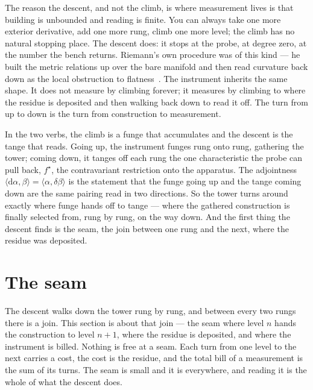 The reason the descent, and not the climb, is where measurement lives is that building is unbounded and reading is finite. You
can always take one more exterior derivative, add one more rung, climb one more level; the climb has no natural stopping
place. The descent does: it stops at the probe, at degree zero, at the number the bench returns. Riemann's own procedure was of
this kind --- he built the metric relations up over the bare manifold and then read curvature back down as the local
obstruction to flatness~\cite{riemann1854}. The instrument inherits the same shape. It does not measure by climbing forever;
it measures by climbing to where the residue is deposited and then walking back down to read it off. The turn from up to
down is the turn from construction to measurement.

In the two verbs, the climb is a funge that accumulates and the descent is the tange that reads. Going up, the instrument
funges rung onto rung, gathering the tower; coming down, it tanges off each rung the one characteristic the probe can pull
back, $f^\star$, the contravariant restriction onto the apparatus. The adjointness $\langle \mathrm{d}\alpha, \beta\rangle =
\langle \alpha, \delta\beta\rangle$ is the statement that the funge going up and the tange coming down are the same pairing
read in two directions. So the tower turns around exactly where funge hands off to tange --- where the gathered construction
is finally selected from, rung by rung, on the way down. And the first thing the descent finds is the seam, the join between
one rung and the next, where the residue was deposited.

\section{The seam}

The descent walks down the tower rung by rung, and between every two rungs there is a join. This section is about that join
--- the seam where level $n$ hands the construction to level $n+1$, where the residue is deposited, and where the instrument
is billed. Nothing is free at a seam. Each turn from one level to the next carries a cost, the cost is the residue, and the
total bill of a measurement is the sum of its turns. The seam is small and it is everywhere, and reading it is the whole of
what the descent does.

